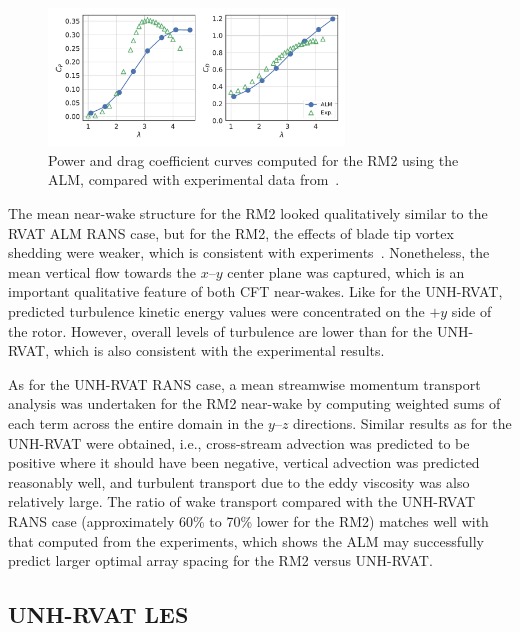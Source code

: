 \documentclass[times]{weauth}
\begin{document}
\begin{figure}
    \centering

    \includegraphics[width=0.7\textwidth]{RM2-ALM_perf-curves}

    \caption{Power and drag coefficient curves computed for the RM2 using the
        ALM, compared with experimental data from~\cite{Bachant2016-RM2-data}.}

    \label{fig:RM2-ALM-perf-curves}
\end{figure}

The mean near-wake structure for the RM2 looked qualitatively similar to the
RVAT ALM RANS case, but for the RM2, the effects of blade tip vortex shedding
were weaker, which is consistent with experiments~\cite{Bachant2016-RM2-paper}.
Nonetheless, the mean vertical flow towards the $x$--$y$ center plane was
captured, which is an important qualitative feature of both CFT near-wakes.
Like for the UNH-RVAT, predicted turbulence kinetic energy values were
concentrated on the $+y$ side of the rotor. However, overall levels of
turbulence are lower than for the UNH-RVAT, which is also consistent with the
experimental results.

As for the UNH-RVAT RANS case, a mean streamwise momentum transport analysis was
undertaken for the RM2 near-wake by computing weighted sums of each term across
the entire domain in the $y$--$z$ directions. Similar results as for the
UNH-RVAT were obtained, i.e., cross-stream advection was predicted to be
positive where it should have been negative, vertical advection was predicted
reasonably well, and turbulent transport due to the eddy viscosity was also
relatively large. The ratio of wake transport compared with the UNH-RVAT RANS
case (approximately 60\% to 70\% lower for the RM2) matches well with that
computed from the experiments, which shows the ALM may successfully predict
larger optimal array spacing for the RM2 versus UNH-RVAT.


\subsection{UNH-RVAT LES}
\end{document}
